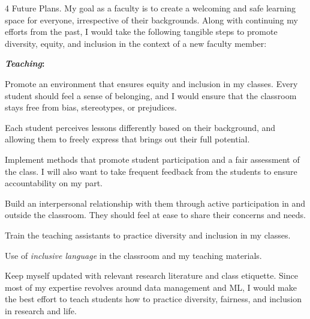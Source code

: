 \documentclass[9pt]{article}
\makeatletter
\def \paragraph {%
    \@startsection{paragraph}%
        {4}%
        \z@\z@{-\fontdimen 6 \font}%
        {\large \scshape \bfseries}%
    }
\newcommand*\heading[1]{\textbf{\textit{#1}:}}
\makeatother
\begin{document}
\paragraph{Future Plans.}
My goal as a faculty is to create a welcoming and safe learning space for everyone, irrespective of their backgrounds. Along with continuing my efforts from the past, I would take the following tangible steps to promote diversity, equity,	and	inclusion in the	context of a new faculty member:

\ifdefined\ApplicationType
    
\else
\fi

\heading{Teaching}
\begin{enumerate*}[leftmargin=*, noitemsep, topsep=0pt, label=(\arabic*)]
    \item Promote an environment that ensures equity and inclusion in my classes. Every student should feel a sense of belonging, and I would ensure that the classroom stays free from bias, stereotypes, or prejudices. 
    \item Each student perceives lessons differently based on their background, and allowing them to freely express that brings out their full potential.
    \item Implement methods that promote student participation and a fair assessment of the class. I will also want to take frequent feedback from the students to ensure accountability on my part.
    \item Build an interpersonal relationship with them through active participation in and outside the classroom. They should feel at ease to share their concerns and needs.
    \item Train the teaching assistants to practice diversity and inclusion in my classes.
    \item Use of \textit{inclusive language} in the classroom and my teaching materials.
    \item Keep myself updated with relevant research literature and class etiquette. Since most of my expertise revolves around data management and ML, I would make the best effort to teach students how to practice diversity, fairness, and inclusion in research and life.
\end{enumerate*}
\end{document}
